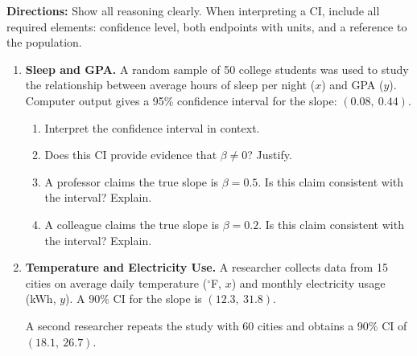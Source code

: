 \documentclass[10pt]{article}
\begin{document}
\namedateperiod

\vspace{0.1in}
\textbf{Directions:} Show all reasoning clearly. When interpreting a CI, include all
required elements: confidence level, both endpoints with units, and a reference to the
population.

\begin{enumerate}

  \item \textbf{Sleep and GPA.} A random sample of 50 college students was used to study
        the relationship between average hours of sleep per night ($x$) and GPA ($y$).
        Computer output gives a 95\% confidence interval for the slope: $(0.08,\ 0.44)$.

        \begin{enumerate}[label=\alph*.]

          \item Interpret the confidence interval in context.


          \item Does this CI provide evidence that $\beta \ne 0$? Justify.


          \item A professor claims the true slope is $\beta = 0.5$.
                Is this claim consistent with the interval? Explain.


          \item A colleague claims the true slope is $\beta = 0.2$.
                Is this claim consistent with the interval? Explain.


        \end{enumerate}

  \item \textbf{Temperature and Electricity Use.} A researcher collects data from 15 cities
        on average daily temperature ($^\circ$F, $x$) and monthly electricity usage
        (kWh, $y$). A 90\% CI for the slope is $(12.3,\ 31.8)$.

        A second researcher repeats the study with 60 cities and obtains a 90\% CI of
        $(18.1,\ 26.7)$.

        \begin{enumerate}[label=\alph*.]


\end{enumerate}
\end{enumerate}
\end{document}
